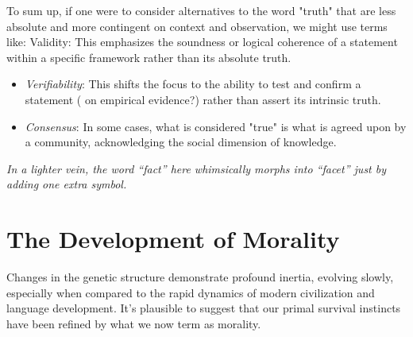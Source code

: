 \documentclass[11pt,a4]{article}
\begin{document}
To sum up, if one were to consider alternatives to the word "truth" that are less absolute and more contingent on context and observation, we might use terms like:
Validity: This emphasizes the soundness or logical coherence of a statement within a specific framework rather than its absolute truth.

\begin{itemize}

    \item \textit{Verifiability}: This shifts the focus to the ability to test and confirm a statement ( on empirical evidence?) rather than assert its intrinsic truth.
    \item \textit{Consensus}: In some cases, what is considered "true" is what is agreed upon by a community, acknowledging the social dimension of knowledge.

\end{itemize}

\textit{In a lighter vein, the word “fact” here whimsically morphs into “facet” just by adding one extra symbol.
} \\
\par




\section{The Development of Morality}

Changes in the genetic structure demonstrate profound inertia, evolving slowly, especially when compared to the rapid dynamics of modern civilization and language development. It's plausible to suggest that our primal survival instincts have been refined by what we now term as morality.
\end{document}
